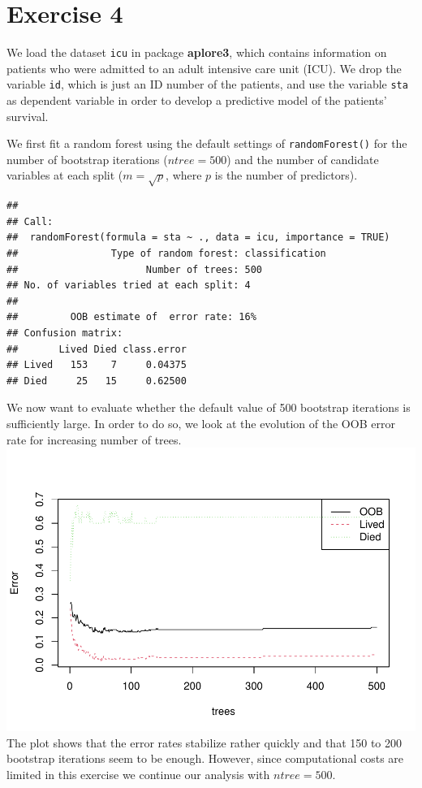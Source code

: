 \documentclass[
]{article}
\begin{document}
\newpage

\section{Exercise 4}\label{exercise-4}

We load the dataset \texttt{icu} in package \textbf{aplore3}, which
contains information on patients who were admitted to an adult intensive
care unit (ICU). We drop the variable \texttt{id}, which is just an ID
number of the patients, and use the variable \texttt{sta} as dependent
variable in order to develop a predictive model of the patients'
survival.

We first fit a random forest using the default settings of
\texttt{randomForest()} for the number of bootstrap iterations
(\(ntree = 500\)) and the number of candidate variables at each split
(\(m = \sqrt{p}\), where \(p\) is the number of predictors).

\begin{verbatim}
## 
## Call:
##  randomForest(formula = sta ~ ., data = icu, importance = TRUE) 
##                Type of random forest: classification
##                      Number of trees: 500
## No. of variables tried at each split: 4
## 
##         OOB estimate of  error rate: 16%
## Confusion matrix:
##       Lived Died class.error
## Lived   153    7     0.04375
## Died     25   15     0.62500
\end{verbatim}

We now want to evaluate whether the default value of 500 bootstrap
iterations is sufficiently large. In order to do so, we look at the
evolution of the OOB error rate for increasing number of trees.
\includegraphics{A3_files/figure-latex/unnamed-chunk-19-1.pdf} The plot
shows that the error rates stabilize rather quickly and that 150 to 200
bootstrap iterations seem to be enough. However, since computational
costs are limited in this exercise we continue our analysis with
\(ntree = 500\).
\end{document}
